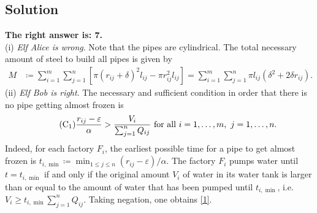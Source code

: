 \documentclass[12pt]{article}
\begin{document}


\newpage%

\subsection{Solution}
\textbf{The right answer is: 7.}\\

(i) \textit{Elf Alice is wrong}. Note that the pipes are cylindrical. The total necessary amount of steel to build all pipes is given by
\begin{align}
M &\coloneqq \sum_{i=1}^m\sum_{j=1}^n \left[\pi(r_{ij} + \delta)^2l_{ij} - \pi r_{ij}^2l_{ij}\right] = \sum_{i=1}^m\sum_{j=1}^n \pi l_{ij}\left(\delta^2 + 2\delta r_{ij}\right).\label{M}\tag{A}
\end{align}
(ii) \textit{Elf Bob is right}. The necessary and sufficient condition in order that there is no pipe getting almost frozen is
\begin{align}
\label{1}
\tag{${\rm C}_1$}
\frac{r_{ij} - \varepsilon}{\alpha} > \frac{V_i}{\sum_{j=1}^n Q_{ij}} \mbox{ for all } i = 1,\ldots,m,\ j = 1,\ldots,n.
\end{align}
Indeed, for each factory $F_i$, the earliest possible time for a pipe to get almost frozen is $t_{i,\min} \coloneqq \min_{1\le j\le n} (r_{ij} - \varepsilon)/\alpha$. The factory $F_i$ pumps water until $t = t_{i,\min}$ if and only if the original amount $V_i$ of water in its water tank is larger than or equal to the amount of water that has been pumped until $t_{i,\min}$, i.e. $V_i\ge t_{i,\min}\sum_{j=1}^n Q_{ij}$. Taking negation, one obtains \eqref{1}.
\end{document}
